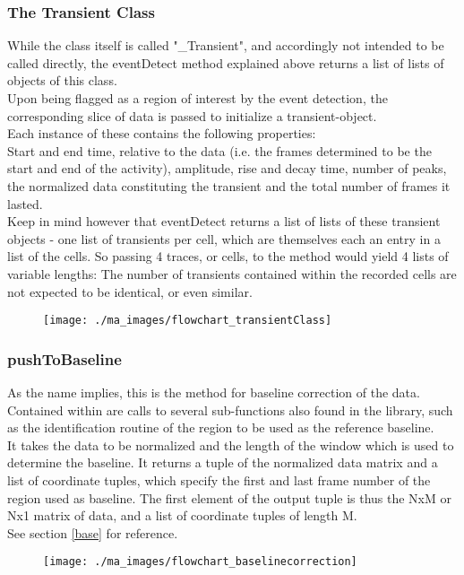 \documentclass[titlepage]{article}
\begin{document}
\subsubsection{The Transient Class}
While the class itself is called "\_Transient", and accordingly not intended to be called directly, the eventDetect method explained above returns a list of lists of objects of this class.\\
Upon being flagged as a region of interest by the event detection, the corresponding slice of data is passed to initialize a transient-object.\\
Each instance of these contains the following properties:\\
Start and end time, relative to the data (i.e. the frames determined to be the start and end of the activity), amplitude, rise and decay time, number of peaks, the normalized data constituting the transient and the total number of frames it lasted.\\
Keep in mind however that eventDetect returns a list of lists of these transient objects - one list of transients per cell, which are themselves each an entry in a list of the cells. So passing 4 traces, or cells, to the method would yield 4 lists of variable lengths: The number of transients contained within the recorded cells are not expected to be identical, or even similar.
\begin{figure}[H]
\centering
\texttt{[image: ./ma\_images/flowchart\_transientClass]}
\label{fig:flowchart_transientClass}
\end{figure}

\subsubsection{pushToBaseline}
As the name implies, this is the method for baseline correction of the data.\\
Contained within are calls to several sub-functions also found in the library, such as the identification routine of the region to be used as the reference baseline.\\
It takes the data to be normalized and the length of the window which is used to determine the baseline. It returns a tuple of the normalized data matrix and a list of coordinate tuples, which specify the first and last frame number of the region used as baseline. The first element of the output tuple is thus the NxM or Nx1 matrix of data, and a list of coordinate tuples of length M.\\
See section \ref{base} for reference.
\begin{figure}[H]
\centering
\texttt{[image: ./ma\_images/flowchart\_baselinecorrection]}
\label{fig:flowchart_baselinecorrection}
\end{figure}
\end{document}
